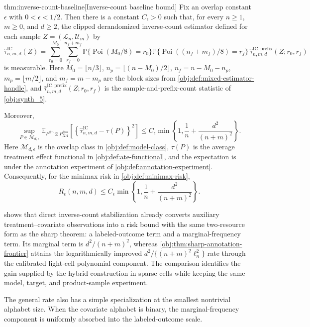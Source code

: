\begin{theoremv}{thm:inverse-count-baseline}[Inverse-count baseline bound]
Fix an overlap constant \(\epsilon\) with \(0<\epsilon<1/2\).  Then there is a constant \(C_\epsilon>0\) such that, for every \(n\ge1\), \(m\ge0\), and \(d\ge2\), the clipped derandomized inverse-count estimator defined for each sample \(Z=(\mathcal L_n,\mathcal U_m)\) by
\[
\widehat\tau^{\mathrm{IC}}_{n,m,d}(Z)
=
\sum_{r_0=0}^{M_0}
\sum_{r_f=0}^{n_f+m_f}
\mathbb P\{\operatorname{Poi}(M_0/8)=r_0\}
\mathbb P\{\operatorname{Poi}((n_f+m_f)/8)=r_f\}
\,\widehat\tau^{\mathrm{IC,prefix}}_{n,m,d}(Z;r_0,r_f)
\]
is measurable.  Here \(M_0=\lfloor n/3\rfloor\), \(n_p=\lfloor(n-M_0)/2\rfloor\), \(n_f=n-M_0-n_p\), \(m_p=\lfloor m/2\rfloor\), and \(m_f=m-m_p\) are the block sizes from \cref{obj:def:mixed-estimator-handle}, and \(\widehat\tau^{\mathrm{IC,prefix}}_{n,m,d}(Z;r_0,r_f)\) is the sample-and-prefix-count statistic of \cref{obj:synth_5}.

Moreover,
\[
\sup_{P\in\mathcal M_{d,\epsilon}}
\mathbb E_{P^{\otimes n}\otimes P_{XA}^{\otimes m}}
\left[
\left\{
\widehat\tau^{\mathrm{IC}}_{n,m,d}-\tau(P)
\right\}^2
\right]
\le
C_\epsilon
\min\left\{
1,\frac1n+\frac{d^2}{(n+m)^2}
\right\}.
\]
Here \(\mathcal M_{d,\epsilon}\) is the overlap class in \cref{obj:def:model-class}, \(\tau(P)\) is the average treatment effect functional in \cref{obj:def:ate-functional}, and the expectation is under the annotation experiment of \cref{obj:def:annotation-experiment}.  Consequently, for the minimax risk in \cref{obj:def:minimax-risk},
\[
R_\epsilon(n,m,d)
\le
C_\epsilon
\min\left\{
1,\frac1n+\frac{d^2}{(n+m)^2}
\right\}.
\]
\end{theoremv}

 shows that direct inverse-count stabilization already converts auxiliary treatment--covariate observations into a risk bound with the same two-resource form as the sharp theorem: a labeled-outcome term and a marginal-frequency term. Its marginal term is \(d^2/(n+m)^2\), whereas \cref{obj:thm:sharp-annotation-frontier} attains the logarithmically improved \(d^2/\{(n+m)^2\ell_n^2\}\) rate through the calibrated light-cell polynomial component. The comparison identifies the gain supplied by the hybrid construction in sparse cells while keeping the same model, target, and product-sample experiment.

The general rate also has a simple specialization at the smallest nontrivial alphabet size. When the covariate alphabet is binary, the marginal-frequency component is uniformly absorbed into the labeled-outcome scale.

